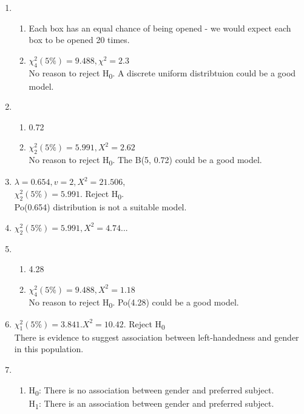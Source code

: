 \documentclass[fleqn]{article}
\begin{document}
\begin{enumerate}
    \item \begin{enumerate}[label=\bfseries \alph*\space ]
            \item Each box has an equal chance of being opened - we would expect each box to be opened 20 times.
            \item $\chi_4^2(5\%)=9.488, \chi^2=2.3$ \\
                No reason to reject H\textsubscript{0}. A discrete uniform distribtuion could be a good model.
        \end{enumerate}
    
    \item \begin{enumerate}[label=\bfseries \alph*\space ]
            \item 0.72
            \item $\chi_2^2(5\%)=5.991, X^2=2.62$ \\
                No reason to reject H\textsubscript{0}. The B(5, 0.72) could be a good model.
        \end{enumerate}
    
    \item $\lambda=0.654, v=2, X^2=21.506$, \\
        $\chi_2^2(5\%)=5.991$. Reject H\textsubscript{0}. \\
        Po(0.654) distribution is not a suitable model.
    
    \item $\chi_2^2(5\%)=5.991, X^2=4.74...$
    
    \item \begin{enumerate}[label=\bfseries \alph*\space ]
            \item 4.28
            \item $\chi_4^2(5\%)=9.488, X^2=1.18$\\
                No reason to reject H\textsubscript{0}. Po(4.28) could be a good model.
        \end{enumerate}
    
    \item $\chi_1^2(5\%)=3.841. X^2=10.42$. Reject H\textsubscript{0} \\
        There is evidence to suggest association between left-handedness and gender in this population.
    
    \newpage
    \item \begin{enumerate}[label=\bfseries \alph*\space ]
            \item H\textsubscript{0}: There is no association between gender and preferred subject. \\
                H\textsubscript{1}: There is an association between gender and preferred subject. \vspace{1mm}
            

\end{enumerate}
\end{enumerate}
\end{document}
